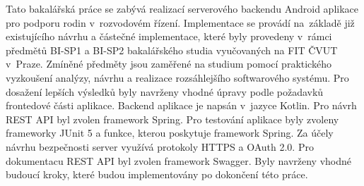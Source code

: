 %
%
Tato bakalářská práce se zabývá realizací serverového backendu Android aplikace pro podporu rodin v~rozvodovém řízení. Implementace se provádí na~základě již existujícího návrhu a částečné implementace, které byly provedeny v~rámci předmětů BI-SP1 a BI-SP2 bakalářského studia vyučovaných na FIT ČVUT v~Praze. Zmíněné předměty jsou zaměřené na studium pomocí praktického vyzkoušení analýzy, návrhu a realizace rozsáhlejšího softwarového systému. Pro dosažení lepších výsledků byly navrženy vhodné úpravy podle požadavků frontedové části aplikace. Backend aplikace je napsán v~jazyce Kotlin. Pro návrh REST API byl zvolen framework Spring. Pro testování aplikace byly zvoleny frameworky JUnit 5 a funkce, kterou poskytuje framework Spring. Za účely návrhu bezpečnosti server využívá protokoly HTTPS a OAuth 2.0. Pro dokumentacu REST API byl zvolen framework Swagger. Byly navrženy vhodné budoucí kroky, které budou implementovány po dokončení této práce.